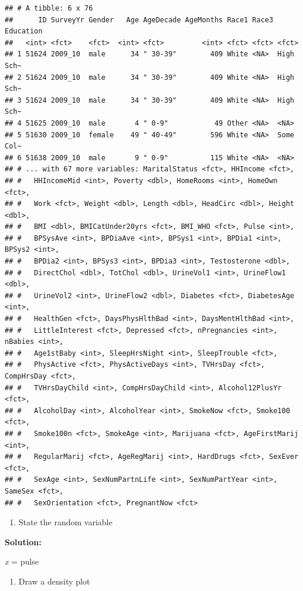 \documentclass[
]{book}
\providecommand{\tightlist}{%
  \setlength{\itemsep}{0pt}\setlength{\parskip}{0pt}}
\begin{document}
\begin{verbatim}
## # A tibble: 6 x 76
##      ID SurveyYr Gender   Age AgeDecade AgeMonths Race1 Race3 Education
##   <int> <fct>    <fct>  <int> <fct>         <int> <fct> <fct> <fct>    
## 1 51624 2009_10  male      34 " 30-39"        409 White <NA>  High Sch~
## 2 51624 2009_10  male      34 " 30-39"        409 White <NA>  High Sch~
## 3 51624 2009_10  male      34 " 30-39"        409 White <NA>  High Sch~
## 4 51625 2009_10  male       4 " 0-9"           49 Other <NA>  <NA>     
## 5 51630 2009_10  female    49 " 40-49"        596 White <NA>  Some Col~
## 6 51638 2009_10  male       9 " 0-9"          115 White <NA>  <NA>     
## # ... with 67 more variables: MaritalStatus <fct>, HHIncome <fct>,
## #   HHIncomeMid <int>, Poverty <dbl>, HomeRooms <int>, HomeOwn <fct>,
## #   Work <fct>, Weight <dbl>, Length <dbl>, HeadCirc <dbl>, Height <dbl>,
## #   BMI <dbl>, BMICatUnder20yrs <fct>, BMI_WHO <fct>, Pulse <int>,
## #   BPSysAve <int>, BPDiaAve <int>, BPSys1 <int>, BPDia1 <int>, BPSys2 <int>,
## #   BPDia2 <int>, BPSys3 <int>, BPDia3 <int>, Testosterone <dbl>,
## #   DirectChol <dbl>, TotChol <dbl>, UrineVol1 <int>, UrineFlow1 <dbl>,
## #   UrineVol2 <int>, UrineFlow2 <dbl>, Diabetes <fct>, DiabetesAge <int>,
## #   HealthGen <fct>, DaysPhysHlthBad <int>, DaysMentHlthBad <int>,
## #   LittleInterest <fct>, Depressed <fct>, nPregnancies <int>, nBabies <int>,
## #   Age1stBaby <int>, SleepHrsNight <int>, SleepTrouble <fct>,
## #   PhysActive <fct>, PhysActiveDays <int>, TVHrsDay <fct>, CompHrsDay <fct>,
## #   TVHrsDayChild <int>, CompHrsDayChild <int>, Alcohol12PlusYr <fct>,
## #   AlcoholDay <int>, AlcoholYear <int>, SmokeNow <fct>, Smoke100 <fct>,
## #   Smoke100n <fct>, SmokeAge <int>, Marijuana <fct>, AgeFirstMarij <int>,
## #   RegularMarij <fct>, AgeRegMarij <int>, HardDrugs <fct>, SexEver <fct>,
## #   SexAge <int>, SexNumPartnLife <int>, SexNumPartYear <int>, SameSex <fct>,
## #   SexOrientation <fct>, PregnantNow <fct>
\end{verbatim}

\begin{enumerate}
\def\labelenumi{\alph{enumi}.}
\tightlist
\item
  State the random variable
\end{enumerate}

\textbf{Solution:}

\emph{x} = pulse

\begin{enumerate}
\def\labelenumi{\alph{enumi}.}
\setcounter{enumi}{1}
\tightlist
\item
  Draw a density plot
\end{enumerate}
\end{document}
